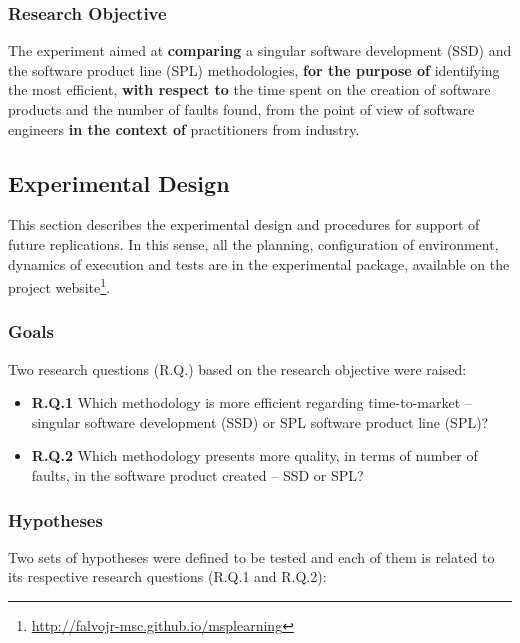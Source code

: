 \subsubsection{Research Objective}\label{sub:object}

The experiment aimed at \textbf{comparing} a singular software development (SSD) and the software product line (SPL) methodologies, \textbf{for the purpose of} identifying the most efficient, \textbf{with respect to} the time spent on the creation of software products and the number of faults found, from the point of view of software engineers \textbf{in the context of} practitioners from industry.


\subsection{Experimental Design}\label{sub:design}

This section describes the experimental design and procedures for support of future replications. In this sense, all the planning, configuration of environment, dynamics of execution and tests are in the experimental package, available on the project website\footnote{\url{http://falvojr-msc.github.io/msplearning}}.

\subsubsection{Goals}

Two research questions (R.Q.) based on the research objective were raised:

\begin{itemize}
\setlength\itemsep{0.8em}
\item \textbf{R.Q.1} Which methodology is more efficient regarding time-to-market -- singular software development (SSD) or SPL software product line (SPL)?
\item \textbf{R.Q.2} Which methodology presents more quality, in terms of number of faults, in the software product created -- SSD or SPL?
\end{itemize}

\subsubsection{Hypotheses}

Two sets of hypotheses were defined to be tested and each of them is related to its respective research questions (R.Q.1 and R.Q.2):

